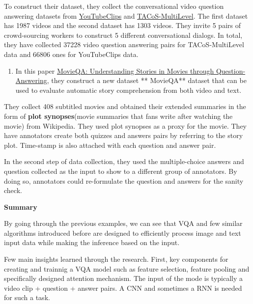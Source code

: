 \documentclass{acm_proc_article-sp}
\renewcommand{\paragraph}[1]{\vskip 6pt\noindent\textbf{#1 }}
\providecommand{\tightlist}{%
  \setlength{\itemsep}{0pt}\setlength{\parskip}{0pt}}
\begin{document}
To construct their dataset, they collect the conversational video
question answering datasets from
\href{http://upplysingaoflun.ecn.purdue.edu/~yu239/}{YouTubeClips} and
\href{https://www.mpi-inf.mpg.de/departments/computer-vision-and-multimodal-computing/research/vision-and-language/tacos-multi-level-corpus/}{TACoS-MultiLevel}.
The first dataset has 1987 videos and the second dataset has 1303
videos. They invite 5 pairs of crowd-sourcing workers to construct 5
different conversational dialogs. In total, they have collected 37228
video question answering pairs for TACoS-MultiLevel data and 66806 ones
for YouTubeClips data.

\begin{enumerate}
\def\labelenumi{\arabic{enumi}.}
\setcounter{enumi}{3}
\tightlist
\item
  In this paper \href{https://arxiv.org/pdf/1512.02902.pdf}{MovieQA:
  Understanding Stories in Movies through Question-Answering}, they
  construct a new dataset ** MovieQA** dataset that can be used to
  evaluate automatic story comprehension from both video and text.
\end{enumerate}

They collect 408 subtitled movies and obtained their extended summaries
in the form of \textbf{plot synopses}(movie summaries that fans write
after watching the movie) from Wikipedia. They used plot synopses as a
proxy for the movie. They have annotators create both quizzes and
answers pairs by referring to the story plot. Time-stamp is also
attached with each question and answer pair.

In the second step of data collection, they used the multiple-choice
answers and question collected as the input to show to a different group
of annotators. By doing so, annotators could re-formulate the question
and answers for the sanity check.

\paragraph{Summary}\label{summary-1}

By going through the previous examples, we can see that VQA and few
similar algorithms introduced before are designed to efficiently process
image and text input data while making the inference based on the input.

Few main insights learned through the research. First, key components
for creating and trainnig a VQA model such as feature selection, feature
pooling and specifically designed attention mechanism. The input of the
mode is typically a video clip + question + answer pairs. A CNN and
sometimes a RNN is needed for such a task.
\end{document}
